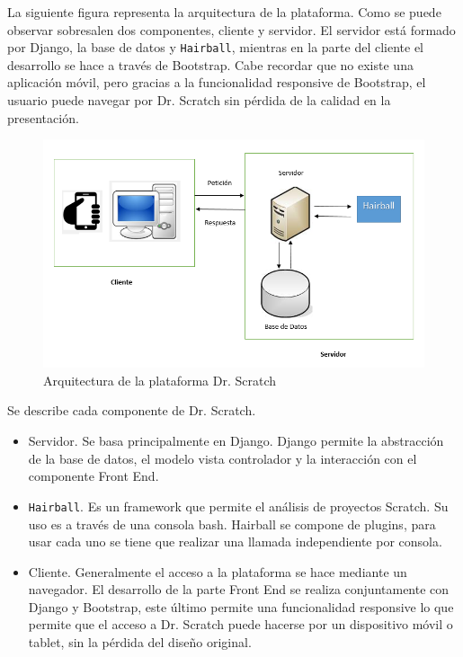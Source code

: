 \documentclass[a4paper, 12pt]{book}
\begin{document}
La siguiente figura representa la arquitectura de la plataforma. Como se puede observar
sobresalen dos componentes, cliente y servidor. El servidor está formado por Django,
la base de datos y \texttt{Hairball}, mientras en la parte del cliente el desarrollo
se hace a través de Bootstrap. Cabe recordar que no existe una aplicación móvil, 
pero gracias a la funcionalidad responsive de Bootstrap, el usuario puede 
navegar por Dr. Scratch sin pérdida de la calidad en la presentación. \\


\begin{figure}
  \centering
	\graphicspath{{img/}}
  \includegraphics[bb=0 0 800 600, width=14cm, keepaspectratio]{arquitecturascratch.png}
	\caption{Arquitectura de la plataforma Dr. Scratch}
  \label{figura:foro_hilos}
\end{figure}

Se describe cada componente de Dr. Scratch.

\begin{itemize}
  \item Servidor. Se basa principalmente en Django. Django permite la abstracción de la
	base de datos, el modelo vista controlador y la interacción con el componente Front End.
  \item \texttt{Hairball}. Es un framework que permite el análisis de proyectos Scratch. Su uso es
	a través de una consola bash. Hairball se compone de plugins, para usar cada uno se
	tiene que realizar una llamada independiente por consola.
  \item Cliente. Generalmente el acceso a la plataforma se hace mediante un navegador. El
	desarrollo de la parte Front End se realiza conjuntamente con Django y Bootstrap, este
	último permite una funcionalidad responsive lo que permite que el acceso a Dr. Scratch
	puede hacerse por un dispositivo móvil o tablet, sin la pérdida del diseño original. 
\end{itemize}
\end{document}
